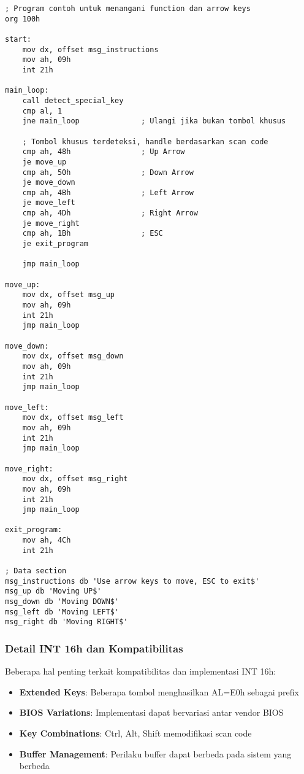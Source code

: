 \documentclass[../main.tex]{subfiles}
\begin{document}
\begin{lstlisting}[language={[x86masm]Assembler}, caption=Handler untuk Function dan Arrow Keys, label={lst:arrow-function}]
; Program contoh untuk menangani function dan arrow keys
org 100h

start:
    mov dx, offset msg_instructions
    mov ah, 09h
    int 21h
    
main_loop:
    call detect_special_key
    cmp al, 1
    jne main_loop              ; Ulangi jika bukan tombol khusus
    
    ; Tombol khusus terdeteksi, handle berdasarkan scan code
    cmp ah, 48h                ; Up Arrow
    je move_up
    cmp ah, 50h                ; Down Arrow
    je move_down
    cmp ah, 4Bh                ; Left Arrow
    je move_left
    cmp ah, 4Dh                ; Right Arrow
    je move_right
    cmp ah, 1Bh                ; ESC
    je exit_program
    
    jmp main_loop
    
move_up:
    mov dx, offset msg_up
    mov ah, 09h
    int 21h
    jmp main_loop
    
move_down:
    mov dx, offset msg_down
    mov ah, 09h
    int 21h
    jmp main_loop
    
move_left:
    mov dx, offset msg_left
    mov ah, 09h
    int 21h
    jmp main_loop
    
move_right:
    mov dx, offset msg_right
    mov ah, 09h
    int 21h
    jmp main_loop
    
exit_program:
    mov ah, 4Ch
    int 21h

; Data section
msg_instructions db 'Use arrow keys to move, ESC to exit$'
msg_up db 'Moving UP$'
msg_down db 'Moving DOWN$'
msg_left db 'Moving LEFT$'
msg_right db 'Moving RIGHT$'
\end{lstlisting}

\subsubsection{Detail INT 16h dan Kompatibilitas}
Beberapa hal penting terkait kompatibilitas dan implementasi INT 16h:

\begin{itemize}
    \item \textbf{Extended Keys}: Beberapa tombol menghasilkan AL=E0h sebagai prefix
    \item \textbf{BIOS Variations}: Implementasi dapat bervariasi antar vendor BIOS
    \item \textbf{Key Combinations}: Ctrl, Alt, Shift memodifikasi scan code
    \item \textbf{Buffer Management}: Perilaku buffer dapat berbeda pada sistem yang berbeda
\end{itemize}
\end{document}
